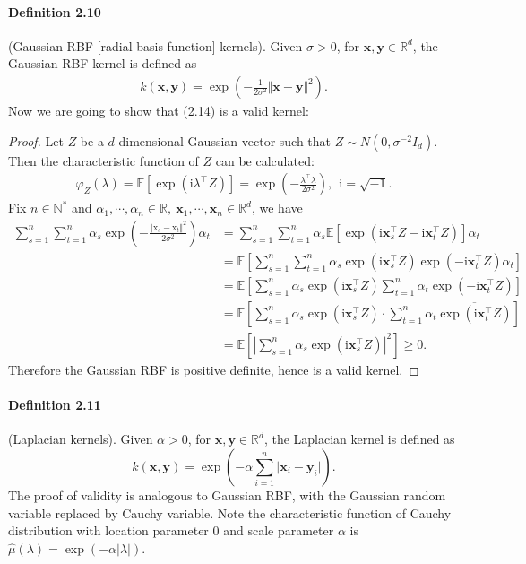 \documentclass{article}
\begin{document}
\paragraph{Definition 2.10} (Gaussian RBF [radial basis function] kernels). Given $\sigma > 0$, for $\mathbf{x},\mathbf{y}\in\mathbb{R}^d$, the Gaussian RBF kernel is defined as
\begin{align*}
	k(\mathbf{x}, \mathbf{y}) = \exp\left(-\frac{1}{2\sigma^2}\Vert \mathbf{x} - \mathbf{y}\Vert^2\right).\tag{2.14}
\end{align*}
Now we are going to show that (2.14) is a valid kernel:
\begin{proof}
Let $Z$ be a $d$-dimensional Gaussian vector such that $Z\sim N(0,\sigma^{-2}I_d)$. Then the characteristic function of $Z$ can be calculated:
\begin{align*}
	\varphi_Z(\lambda) = \mathbb{E}\left[\exp\left(\mathrm{i}\lambda^\top Z\right)\right] = \exp\left(-\frac{\lambda^\top\lambda}{2\sigma^2}\right),\ \ \mathrm{i}=\sqrt{-1}.\tag{2.15}
\end{align*}
Fix $n\in\mathbb{N}^{*}$ and $\alpha_1,\cdots,\alpha_n\in\mathbb{R},\ \mathbf{x}_1,\cdots,\mathbf{x}_n\in\mathbb{R}^d$, we have
\begin{align*}
\sum_{s=1}^n\sum_{t=1}^n \alpha_s \exp\left(-\frac{\Vert \mathrm{x}_s - \mathrm{x}_t\Vert^2}{2\sigma^2}\right)\alpha_t &= \sum_{s=1}^n\sum_{t=1}^n \alpha_s\mathbb{E}\left[\exp(\mathrm{i}\mathbf{x}_s^\top Z - \mathrm{i}\mathbf{x}_t^\top Z)\right]\alpha_t \\
&= \mathbb{E} \left[\sum_{s=1}^n\sum_{t=1}^n\alpha_s\exp(\mathrm{i}\mathbf{x}_s^\top Z)  \exp(-\mathrm{i}\mathbf{x}_t^\top Z)\alpha_t\right] \\
&= \mathbb{E}\left[\sum_{s=1}^n\alpha_s\exp(\mathrm{i}\mathbf{x}_s^\top Z)  \sum_{t=1}^n\alpha_t\exp(-\mathrm{i}\mathbf{x}_t^\top Z)\right] \\
&= \mathbb{E}\left[\sum_{s=1}^n\alpha_s\exp(\mathrm{i}\mathbf{x}_s^\top Z)  \cdot\sum_{t=1}^n\alpha_t\overline{\exp(\mathrm{i}\mathbf{x}_t^\top Z)}\right] \\
&= \mathbb{E}\left[\left\vert\sum_{s=1}^n\alpha_s\exp(\mathrm{i}\mathbf{x}_s^\top Z)\right\vert^2\right] \geq 0.\tag{2.16}
\end{align*}
Therefore the Gaussian RBF is positive definite, hence is a valid kernel.
\end{proof}

\paragraph{Definition 2.11} (Laplacian kernels). Given $\alpha > 0$, for $\mathbf{x},\mathbf{y}\in\mathbb{R}^d$, the Laplacian kernel is defined as
\begin{equation*}
	k(\mathbf{x}, \mathbf{y}) = \exp\left(-\alpha\sum_{i=1}^n \vert \mathbf{x}_i - \mathbf{y}_i\vert\right).\tag{2.17}
\end{equation*}
The proof of validity is analogous to Gaussian RBF, with the Gaussian random variable replaced by Cauchy variable. Note the characteristic function of Cauchy distribution with location parameter $0$ and scale parameter $\alpha$ is $\hat{\mu}(\lambda) = \exp\left(-\alpha\vert\lambda\vert\right)$.
\end{document}
